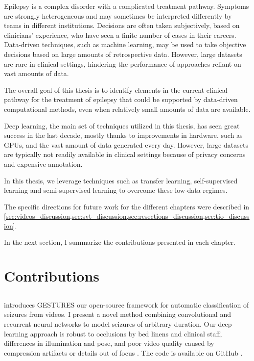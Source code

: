 
Epilepsy is a complex disorder with a complicated treatment pathway.
Symptoms are strongly heterogeneous and may sometimes be interpreted differently by teams in different institutions.
Decisions are often taken subjectively, based on clinicians' experience, who have seen a finite number of cases in their careers.
Data-driven techniques, such as machine learning, may be used to take objective decisions based on large amounts of retrospective data.
However, large datasets are rare in clinical settings, hindering the performance of approaches reliant on vast amounts of data.

The overall goal of this thesis is to identify elements in the current clinical pathway for the treatment of epilepsy that could be supported by data-driven computational methods, even when relatively small amounts of data are available.


Deep learning, the main set of techniques utilized in this thesis, has seen great success in the last decade, mostly thanks to improvements in hardware, such as \acp{GPU}, and the vast amount of data generated every day.
However, large datasets are typically not readily available in clinical settings because of privacy concerns and expensive annotation.

In this thesis, we leverage techniques such as transfer learning, self-supervised learning and semi-supervised learning to overcome these low-data regimes.

The specific directions for future work for the different chapters were described in \cref{sec:videos_discussion,sec:svt_discussion,sec:resections_discussion,sec:tio_discussion}.

In the next section, I summarize the contributions presented in each chapter.

\section{Contributions}

\subsection{}

 introduces \ac{GESTURES} our open-source framework for automatic classification of seizures from videos.
I present a novel method combining convolutional and recurrent neural networks to model seizures of arbitrary duration.
Our deep learning approach is robust to occlusions by bed linens and clinical staff, differences in illumination and pose, and poor video quality caused by compression artifacts or details out of focus \cite{perez-garcia_transfer_2021}.
The code is available on GitHub%
.

